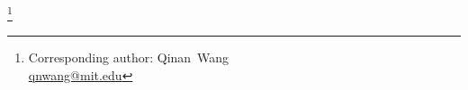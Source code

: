 \documentclass[twocolumn,tighten,times,floatfix]{aastex631}
\newcommand\blfootnote[1]{%
  \begingroup
  \renewcommand\thefootnote{}\footnote{#1}%
  \addtocounter{footnote}{-1}%
  \endgroup
}
\begin{document}
\author[0000-0001-5233-6989]{Qinan~Wang}\blfootnote{Corresponding author: Qinan~Wang\\ \href{mailto:qnwang@mit.edu}{qnwang@mit.edu}}
\affiliation{\MIT}
\author[0000-0002-6230-0151]{David~O.~Jones}
\affiliation{\UHIfA}
\author[0000-0002-2361-7201]{Justin~D.~R.~Pierel}
\affiliation{\STScI}
\author[0000-0003-2445-3891]{Matthew~R.~Siebert}
\affiliation{\STScI}
\author[0000-0002-5153-5983]{W.~D'Arcy~Kenworthy}
\affiliation{\StockholmU}
\author[0000-0003-3221-0419]{Richard Kessler}
\affiliation{\KICP}
\affiliation{\UChicago}
\author[0000-0002-5995-9692]{Mi~Dai} 
\affiliation{\UPitts}
\author[0000-0002-2445-5275]{Ryan~J.~Foley}
\affiliation{\UCSC}
\author[0000-0003-2238-1572]{Ori~D.~Fox}
\affiliation{\STScI}
\author[0000-0003-3703-5154]{Suvi~Gezari}
\affiliation{\UMD}
\affiliation{\JHU}
\author[0000-0001-6395-6702]{Sebastian~Gomez}
\affiliation{\UT}
\author[0000-0002-1052-6749]{Peter~McGill}
\affiliation{\UCSC}
\affiliation{\SSI}
\author[0000-0002-4410-5387]{Armin~Rest}
\affiliation{\STScI}
\affiliation{\JHU}
\author[0000-0002-7559-315X]{César~Rojas-Bravo}
\affiliation{\UCAS}
\affiliation{\NAOC}
\author[0000-0002-9301-5302]{Melissa~Shahbandeh}
\affiliation{\STScI}
\author[0000-0002-7756-4440]{Lou~Strolger}
\affiliation{\STScI}

\end{document}
